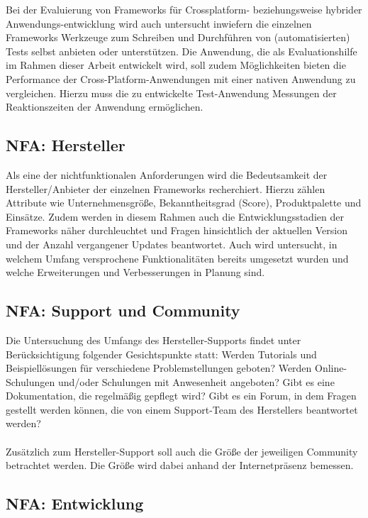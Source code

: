 Bei der Evaluierung von Frameworks für Crossplatform- beziehungsweise hybrider Anwendungs-entwicklung wird auch untersucht inwiefern die einzelnen Frameworks Werkzeuge zum Schreiben und Durchführen von (automatisierten) Tests selbst anbieten oder unterstützen. Die Anwendung, die als Evaluationshilfe im Rahmen dieser Arbeit entwickelt wird, soll zudem Möglichkeiten bieten die Performance der Cross-Platform-Anwendungen mit einer nativen Anwendung zu vergleichen. Hierzu muss die zu entwickelte Test-Anwendung Messungen der Reaktionszeiten der Anwendung ermöglichen. 

\subsection{NFA: Hersteller}

Als eine der nichtfunktionalen Anforderungen wird die Bedeutsamkeit der Hersteller/Anbieter der einzelnen Frameworks recherchiert. Hierzu zählen Attribute wie Unternehmensgröße, Bekanntheitsgrad (Score), Produktpalette und Einsätze. Zudem werden in diesem Rahmen auch die Entwicklungsstadien der Frameworks näher durchleuchtet und Fragen hinsichtlich der aktuellen Version und der Anzahl vergangener Updates beantwortet. Auch wird untersucht, in welchem Umfang versprochene Funktionalitäten bereits umgesetzt wurden und welche Erweiterungen und Verbesserungen in Planung sind.  

\subsection{NFA: Support und Community}

Die Untersuchung des Umfangs des Hersteller-Supports findet unter Berücksichtigung folgender Gesichtspunkte statt: Werden Tutorials und Beispiellösungen für verschiedene Problemstellungen geboten? Werden Online-Schulungen und/oder Schulungen mit Anwesenheit angeboten? Gibt es eine Dokumentation, die regelmäßig gepflegt wird? Gibt es ein Forum, in dem Fragen gestellt werden können, die von einem Support-Team des Herstellers beantwortet werden? 
\\\\
Zusätzlich zum Hersteller-Support soll auch die Größe der jeweiligen Community betrachtet werden. Die Größe wird dabei anhand der Internetpräsenz bemessen. 

\subsection{NFA: Entwicklung}

